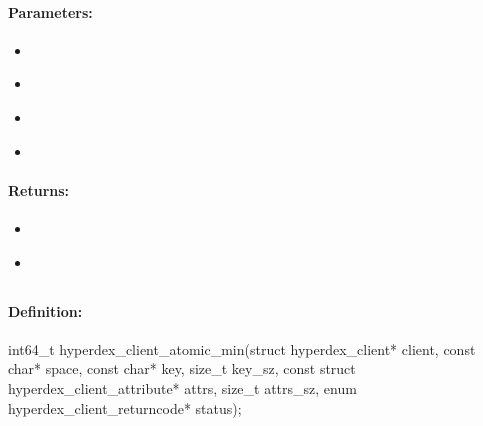 \paragraph{Parameters:}
\begin{itemize}[noitemsep]
\item {}\\

\item {}\\

\item {}\\

\item {}\\

\end{itemize}

\paragraph{Returns:}
\begin{itemize}[noitemsep]
\item {}\\

\item {}\\

\end{itemize}

\pagebreak
\subsection{}
\label{api:c:atomic_min}


\paragraph{Definition:}
\begin{ccode}
int64_t hyperdex_client_atomic_min(struct hyperdex_client* client,
        const char* space,
        const char* key, size_t key_sz,
        const struct hyperdex_client_attribute* attrs, size_t attrs_sz,
        enum hyperdex_client_returncode* status);
\end{ccode}

